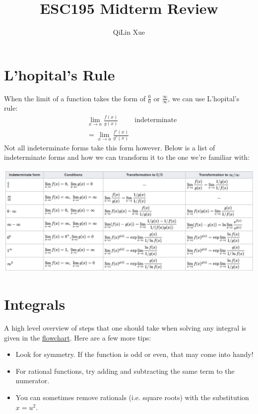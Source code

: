 \documentclass{article}
\title{ESC195 Midterm Review}
\author{QiLin Xue}
\begin{document}
    \maketitle
    \tableofcontents
    \section{L'hopital's Rule}
    When the limit of a function takes the form of $\frac{0}{0}$ or $\frac{\infty}{\infty}$, we can use L'hopital's rule:
    \begin{align}
        & \lim_{x \to a} \frac{f(x)}{g(x)} & \text{indeterminate} \\ 
        &= \lim_{x\to a} \frac{f'(x)}{g'(x)}
    \end{align}
    Not all indeterminate forms take this form however. Below is a list of indeterminate forms and how we can transform it to the one we're familiar with:
    \begin{center}
        \includegraphics[width=\linewidth]{figures/indeterminate.png}
    \end{center}
    \section{Integrals}
    A high level overview of steps that one should take when solving any integral is given in the \href{http://xueqilin.me/engsci-2t4/esc195/integral_flowchart.pdf}{flowchart}. Here are a few more tips:
    \begin{itemize}
        \item Look for symmetry. If the function is odd or even, that may come into handy!
        \item For rational functions, try adding and subtracting the same term to the numerator.
        \item You can sometimes remove rationals (i.e. square roots) with the substitution $x=u^2$.
    \end{itemize}
\end{document}
